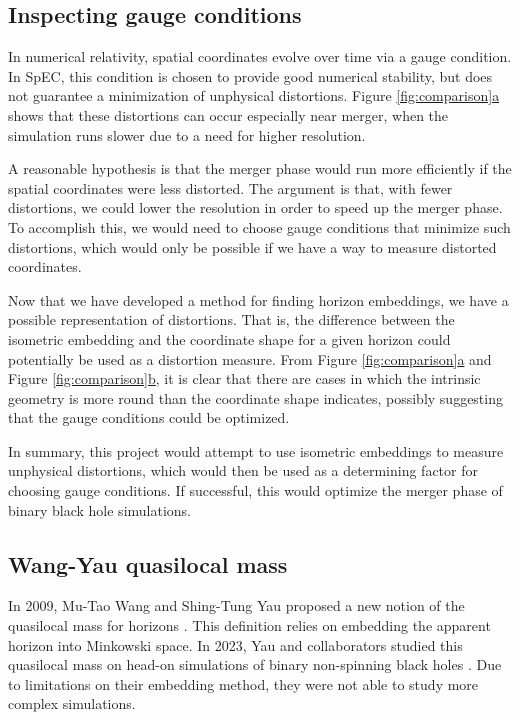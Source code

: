 \documentclass{../letter}
\newcommand{\fig}[2][\empty]{Figure \hyperref[fig:#2]{\ref{fig:#2}#1}}
\begin{document}
	\subsection{Inspecting gauge conditions}

	In numerical relativity, spatial coordinates evolve over time via a gauge condition. In SpEC, this condition is chosen to provide good numerical stability, but does not guarantee a minimization of unphysical distortions. \fig[a]{comparison} shows that these distortions can occur especially near merger, when the simulation runs slower due to a need for higher resolution.
	
	A reasonable hypothesis is that the merger phase would run more efficiently if the spatial coordinates were less distorted. The argument is that, with fewer distortions, we could lower the resolution in order to speed up the merger phase. To accomplish this, we would need to choose gauge conditions that minimize such distortions, which would only be possible if we have a way to measure distorted coordinates.
	
	Now that we have developed a method for finding horizon embeddings, we have a possible representation of distortions. That is, the difference between the isometric embedding and the coordinate shape for a given horizon could potentially be used as a distortion measure. From \fig[a]{comparison} and \fig[b]{comparison}, it is clear that there are cases in which the intrinsic geometry is more round than the coordinate shape indicates, possibly suggesting that the gauge conditions could be optimized.
	
	In summary, this project would attempt to use isometric embeddings to measure unphysical distortions, which would then be used as a determining factor for choosing gauge conditions. If successful, this would optimize the merger phase of binary black hole simulations.

	\subsection{Wang-Yau quasilocal mass}

	In 2009, Mu-Tao Wang and Shing-Tung Yau proposed a new notion of the quasilocal mass for horizons \cite{WangYau_2009}. This definition relies on embedding the apparent horizon into Minkowski space. In 2023, Yau and collaborators studied this quasilocal mass on head-on simulations of binary non-spinning black holes \cite{Yau_2023}. Due to limitations on their embedding method, they were not able to study more complex simulations.
\end{document}
